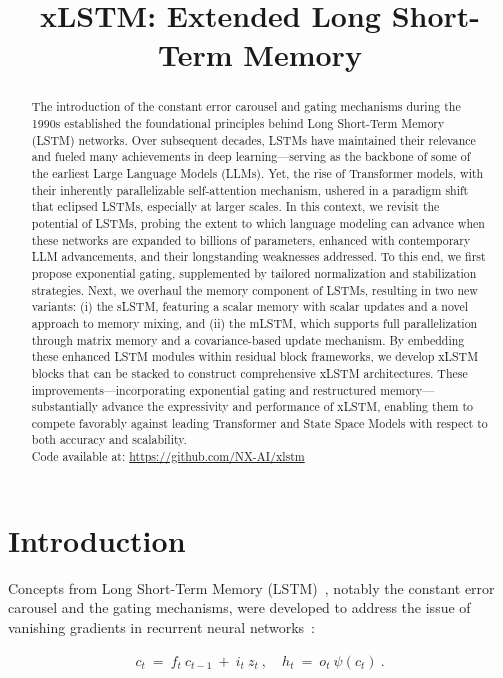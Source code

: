 \title{xLSTM: Extended Long Short-Term Memory}

\begin{abstract}
The introduction of the constant error carousel and gating mechanisms during the 1990s established the foundational principles behind Long Short-Term Memory (LSTM) networks. Over subsequent decades, LSTMs have maintained their relevance and fueled many achievements in deep learning—serving as the backbone of some of the earliest Large Language Models (LLMs). Yet, the rise of Transformer models, with their inherently parallelizable self-attention mechanism, ushered in a paradigm shift that eclipsed LSTMs, especially at larger scales. In this context, we revisit the potential of LSTMs, probing the extent to which language modeling can advance when these networks are expanded to billions of parameters, enhanced with contemporary LLM advancements, and their longstanding weaknesses addressed. To this end, we first propose exponential gating, supplemented by tailored normalization and stabilization strategies. Next, we overhaul the memory component of LSTMs, resulting in two new variants: (i) the sLSTM, featuring a scalar memory with scalar updates and a novel approach to memory mixing, and (ii) the mLSTM, which supports full parallelization through matrix memory and a covariance-based update mechanism. By embedding these enhanced LSTM modules within residual block frameworks, we develop xLSTM blocks that can be stacked to construct comprehensive xLSTM architectures. These improvements—incorporating exponential gating and restructured memory—substantially advance the expressivity and performance of xLSTM, enabling them to compete favorably against leading Transformer and State Space Models with respect to both accuracy and scalability.\\
Code available at: \url{https://github.com/NX-AI/xlstm}
\end{abstract}

\section{Introduction}
\label{sec:intro}

Concepts from Long Short-Term Memory (LSTM)~\citep{Hochreiter:91,Hochreiter:97nips,Hochreiter:97}, notably the constant error carousel and the gating mechanisms, were developed to address the issue of vanishing gradients in recurrent neural networks~\citep{Hochreiter:91,Hochreiter:00book}:

\begin{align}
\label{eq:lstm_idea}
  c_t \ = \ f_t \ c_{t-1} \ + \ 
          i_t \  z_t \ , \quad  
          h_t \ = \ o_t \ \psi({c_t}) \ . 
\end{align}

